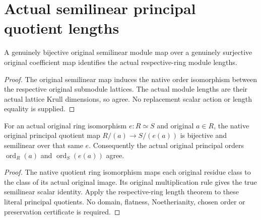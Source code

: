\section{Actual semilinear principal quotient lengths}

\begin{theorem}
\label{thm:fc-semilinear-original-length}
\leanok
{}
A genuinely bijective original semilinear module map over a genuinely
surjective original coefficient map identifies the actual respective-ring
module lengths.
\end{theorem}
\begin{proof}
The original semilinear map induces the native order isomorphism between
the respective original submodule lattices.  The actual module lengths are
their actual lattice Krull dimensions, so agree.  No replacement scalar
action or length equality is supplied.
\end{proof}

\begin{theorem}
\label{thm:fc-original-principal-ring-iso-order}
\leanok
{}
For an actual original ring isomorphism $e:R\simeq S$ and original $a\in R$,
the native original principal quotient map $R/(a)\to S/(e(a))$ is bijective
and semilinear over that same $e$.  Consequently the actual original
principal orders $\operatorname{ord}_R(a)$ and
$\operatorname{ord}_S(e(a))$ agree.
\end{theorem}
\begin{proof}
The native quotient ring isomorphism maps each original residue class to
the class of its actual original image.  Its original multiplication rule
gives the true semilinear scalar identity.  Apply the respective-ring length
theorem to these literal principal quotients.  No domain, flatness,
Noetherianity, chosen order or preservation certificate is required.
\end{proof}

